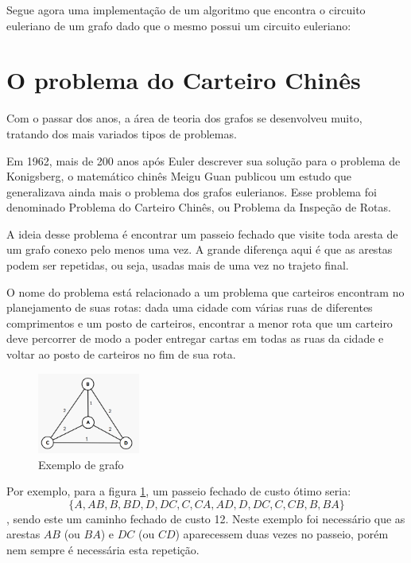 \documentclass{article}
\begin{document}
Segue agora uma implementação de um algoritmo que encontra o circuito euleriano de um grafo dado que o mesmo possui um circuito euleriano:

 



\section{O problema do Carteiro Chinês}

Com o passar dos anos, a área de teoria dos grafos se desenvolveu muito, tratando dos mais variados tipos de problemas.

Em 1962, mais de 200 anos após Euler descrever sua solução para o problema de Konigsberg, o matemático chinês Meigu Guan publicou um estudo que generalizava ainda mais o problema dos grafos eulerianos. 
Esse problema foi denominado Problema do Carteiro Chinês, ou Problema da Inspeção de Rotas.

A ideia desse problema é encontrar um passeio fechado que visite toda aresta de um grafo conexo pelo menos uma vez. 
A grande diferença aqui é que as arestas podem ser repetidas, ou seja, usadas mais de uma vez no trajeto final.

O nome do problema está relacionado a um problema que carteiros encontram no planejamento de suas rotas: dada uma cidade com várias ruas de diferentes comprimentos e um posto de carteiros, encontrar a menor rota que um carteiro deve percorrer de modo a poder entregar cartas em todas as ruas da cidade e voltar ao posto de carteiros no fim de sua rota.

\begin{figure} 
    \centering
    \includegraphics[width=0.3\textwidth]{graph.png}
	\caption{Exemplo de grafo}
	\label{graph}
\end{figure}

Por exemplo, para a figura \ref{graph}, um passeio fechado de custo ótimo seria: \[ \{A, AB, B, BD, D, DC, C, CA, AD, D, DC, C, CB, B, BA\} \], sendo este um caminho fechado de custo 12.
Neste exemplo foi necessário que as arestas $AB$ (ou $BA$) e $DC$ (ou $CD$) aparecessem duas vezes no passeio, porém nem sempre é necessária esta repetição.
\end{document}

